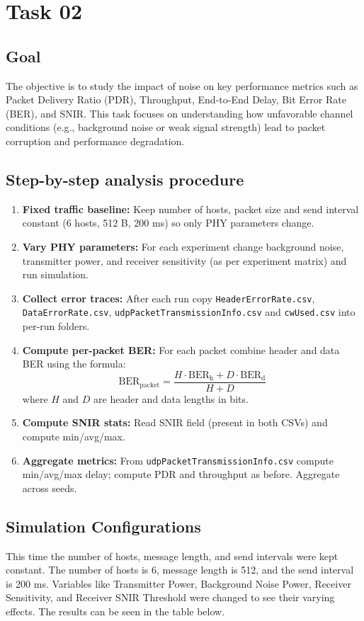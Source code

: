 \documentclass{rapport}
\begin{document}
\newpage

\section{Task 02}
\subsection{Goal}
The objective is to study the impact of noise on key performance metrics such as Packet Delivery Ratio
(PDR), Throughput, End-to-End Delay, Bit Error Rate (BER), and SNIR. This task focuses on
understanding how unfavorable channel conditions (e.g., background noise or weak signal strength) lead to
packet corruption and performance degradation.

\subsection{Step-by-step analysis procedure}
\begin{enumerate}
  \item \textbf{Fixed traffic baseline:} Keep number of hosts, packet size and send interval constant (6 hosts, 512 B, 200 ms) so only PHY parameters change.
  \item \textbf{Vary PHY parameters:} For each experiment change background noise, transmitter power, and receiver sensitivity (as per experiment matrix) and run simulation.
  \item \textbf{Collect error traces:} After each run copy \texttt{HeaderErrorRate.csv}, \texttt{DataErrorRate.csv}, \texttt{udpPacketTransmissionInfo.csv} and \texttt{cwUsed.csv} into per-run folders.
  \item \textbf{Compute per-packet BER:} For each packet combine header and data BER using the formula:
  \[
    \mathrm{BER_{packet}} = \frac{H\cdot \mathrm{BER_h} + D\cdot \mathrm{BER_d}}{H+D}
  \]
  where $H$ and $D$ are header and data lengths in bits.
  \item \textbf{Compute SNIR stats:} Read SNIR field (present in both CSVs) and compute min/avg/max.
  \item \textbf{Aggregate metrics:} From \texttt{udpPacketTransmissionInfo.csv} compute min/avg/max delay; compute PDR and throughput as before. Aggregate across seeds.
\end{enumerate}

\subsection{Simulation Configurations}
This time the number of hosts, message length, and send intervals were kept constant. The number of hosts is 6, message length is 512, and the send interval is 200 ms. Variables like Transmitter Power, Background Noise Power, Receiver Sensitivity, and Receiver SNIR Threshold were changed to see their varying effects. The results can be seen in the table below.
\end{document}
